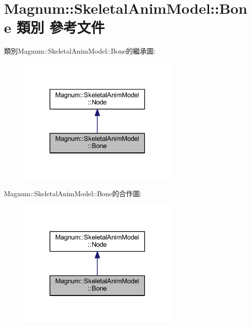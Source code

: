 \hypertarget{class_magnum_1_1_skeletal_anim_model_1_1_bone}{}\section{Magnum\+:\+:Skeletal\+Anim\+Model\+:\+:Bone 類別 參考文件}
\label{class_magnum_1_1_skeletal_anim_model_1_1_bone}


類別\+Magnum\+:\+:Skeletal\+Anim\+Model\+:\+:Bone的繼承圖\+:\nopagebreak
\begin{figure}[H]
\begin{center}
\leavevmode
\includegraphics[width=224pt]{class_magnum_1_1_skeletal_anim_model_1_1_bone__inherit__graph}
\end{center}
\end{figure}


Magnum\+:\+:Skeletal\+Anim\+Model\+:\+:Bone的合作圖\+:\nopagebreak
\begin{figure}[H]
\begin{center}
\leavevmode
\includegraphics[width=224pt]{class_magnum_1_1_skeletal_anim_model_1_1_bone__coll__graph}
\end{center}
\end{figure}

